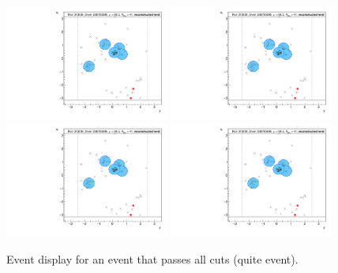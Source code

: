 \begin{figure}[h!]
  \centering
  \includegraphics[page=11,width=0.48\textwidth]{figures/EventDisplays.pdf}
  \includegraphics[page=12,width=0.48\textwidth]{figures/EventDisplays.pdf} \\
  \includegraphics[page=14,width=0.48\textwidth]{figures/EventDisplays.pdf}
  \includegraphics[page=15,width=0.48\textwidth]{figures/EventDisplays.pdf}
  \caption{Event display for an event that passes all cuts (quite event).}
  \label{fig:event-display-2}
\end{figure}


